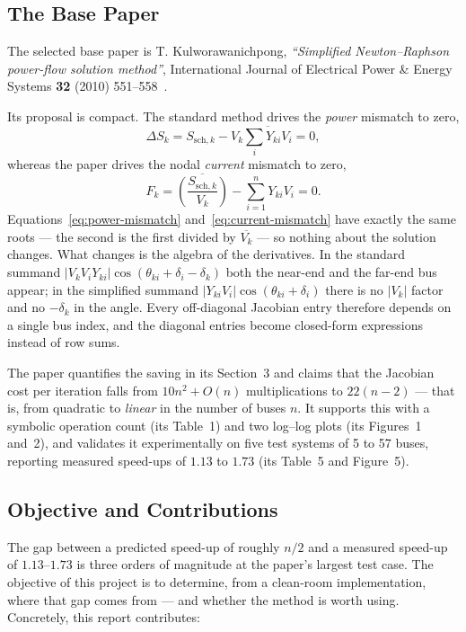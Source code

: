 \documentclass[sigconf,nonacm]{acmart}
\begin{document}
\subsection{The Base Paper}
The selected base paper is T. Kulworawanichpong, \emph{``Simplified
Newton--Raphson power-flow solution method''}, International Journal of
Electrical Power \& Energy Systems \textbf{32} (2010)
551--558~\cite{kulworawanichpong2010}.

Its proposal is compact. The standard method drives the \emph{power} mismatch
to zero,
\begin{equation}
\Delta S_k = S_{\mathrm{sch},k} - V_k \overline{\textstyle\sum_i Y_{ki} V_i} = 0 ,
\label{eq:power-mismatch}
\end{equation}
whereas the paper drives the nodal \emph{current} mismatch to zero,
\begin{equation}
F_k = \overline{\left(\frac{S_{\mathrm{sch},k}}{V_k}\right)}
      - \sum_{i=1}^{n} Y_{ki} V_i = 0 .
\label{eq:current-mismatch}
\end{equation}
Equations~\eqref{eq:power-mismatch} and~\eqref{eq:current-mismatch} have exactly
the same roots --- the second is the first divided by $\overline{V_k}$ --- so
nothing about the solution changes. What changes is the algebra of the
derivatives. In the standard summand
$|V_k V_i Y_{ki}|\cos(\theta_{ki} + \delta_i - \delta_k)$ both the near-end and
the far-end bus appear; in the simplified summand
$|Y_{ki}V_i|\cos(\theta_{ki} + \delta_i)$ there is no $|V_k|$ factor and no
$-\delta_k$ in the angle. Every off-diagonal Jacobian entry therefore depends on
a single bus index, and the diagonal entries become closed-form expressions
instead of row sums.

The paper quantifies the saving in its Section~3 and claims that the Jacobian
cost per iteration falls from $10n^2 + O(n)$ multiplications to $22(n-2)$ ---
that is, from quadratic to \emph{linear} in the number of buses $n$. It supports
this with a symbolic operation count (its Table~1) and two log--log plots (its
Figures~1 and~2), and validates it experimentally on five test systems of 5 to
57 buses, reporting measured speed-ups of $1.13$ to $1.73$ (its Table~5 and
Figure~5).

\subsection{Objective and Contributions}
The gap between a predicted speed-up of roughly $n/2$ and a measured speed-up of
$1.13$--$1.73$ is three orders of magnitude at the paper's largest test case. The
objective of this project is to determine, from a clean-room implementation,
where that gap comes from --- and whether the method is worth using. Concretely,
this report contributes:
\end{document}
